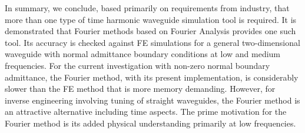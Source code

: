 \documentclass[numreferences]{kluwer}
\begin{document}
In summary, we conclude, based primarily on requirements from
industry, that more than one type of time harmonic waveguide
simulation tool is required. It is demonstrated that Fourier
methods based on Fourier Analysis provides one such tool. Its accuracy
is checked against FE simulations for a general two-dimensional
waveguide with normal admittance boundary conditions at low and medium
frequencies. For the current investigation with non-zero normal
boundary admittance, the Fourier method, with its present
implementation, is considerably slower than the FE method that is more
memory demanding. However, for inverse engineering involving tuning of
straight waveguides, the Fourier method is an attractive
alternative including time aspects. The prime motivation for the
Fourier method is its added physical understanding primarily
at low frequencies.

 

\end{document}
